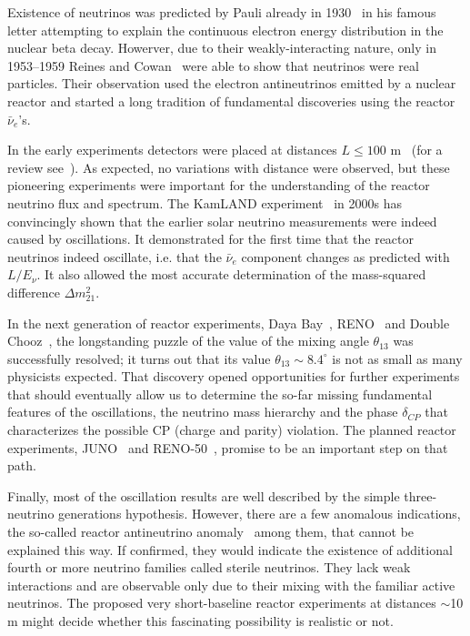 \documentclass[aps,twocolumn,preprintnumbers,amsmath,superscriptaddress,amssymb,floats,nofootinbib]{revtex4-1}
\begin{document}
Existence of neutrinos was predicted by Pauli already in 1930~\cite{Pauli30} in his famous letter attempting to explain the continuous electron energy distribution in the nuclear beta decay. 
Howerver, due to their weakly-interacting nature, only in 1953--1959 Reines and Cowan~\cite{Reines53,Cowan56,Reines59} were able to show that neutrinos were real particles. 
Their observation used the electron antineutrinos emitted by a nuclear reactor and started a long tradition of fundamental discoveries using the reactor $\bar{\nu}_e$'s.

In the early experiments detectors were placed at distances $L \le 100$ m~\cite{ILL,Gosgen,Rovno,Krasnoyarsk,SRP,Bugey4,Bugey3} (for a review see~\cite{Bemporad02}). As expected, no variations
with distance were observed, but these pioneering experiments were important for the understanding of the reactor neutrino flux and spectrum.
The KamLAND experiment~\cite{Kamland03,Kamland05,Kamland08} in 2000s has convincingly shown that the earlier solar neutrino measurements were indeed caused by oscillations. 
It demonstrated for the first time that the reactor neutrinos indeed oscillate, i.e. that the $\bar{\nu}_e$ component changes as predicted with $L/E_{\nu}$. 
It also allowed the most accurate determination of the mass-squared difference $\Delta m^2_{21}$.  

In the next generation of reactor experiments, Daya Bay~\cite{Dayabay,Dayabay14}, RENO~\cite{Reno}  and Double Chooz~\cite{DChooz,DChooz14}, the longstanding puzzle of the
value of the mixing angle $\theta_{13}$ was successfully resolved; it turns out that its value $\theta_{13} \sim 8.4^\circ$
is not as small as many physicists expected. That discovery opened opportunities for further experiments that should eventually allow us to determine the so-far missing fundamental features of the oscillations, the neutrino mass hierarchy and the phase $\delta_{CP}$ that characterizes the possible CP (charge and parity) violation. 
The planned reactor experiments, JUNO~\cite{He-NuFact13} and RENO-50~\cite{RENO-50}, promise to be an important step on that path.

Finally, most of the oscillation results are well described by the simple three-neutrino generations hypothesis. However, there are a few anomalous indications,
the so-called reactor antineutrino anomaly~\cite{Mention} among them, that cannot be explained this way. If confirmed, they would indicate the existence of additional
fourth or more neutrino families called sterile neutrinos. They lack weak interactions and are observable only due to their mixing with the familiar active neutrinos.  The proposed very short-baseline reactor experiments at distances $\sim$10 m might decide whether this fascinating possibility is realistic or not.
\end{document}
